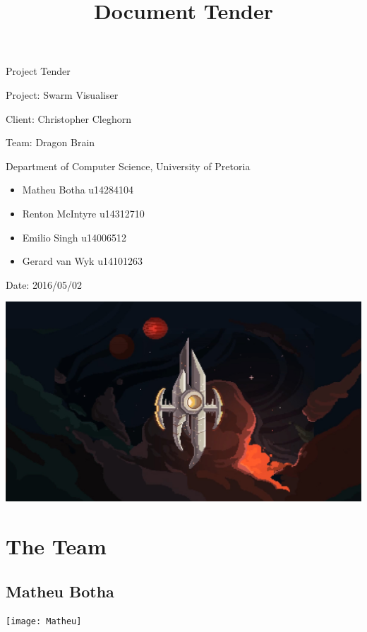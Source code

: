 \documentclass[12pt]{article}
\begin{document}
\title{Document Tender}

\begin{titlepage}
\begin{huge}
\begin{center}
Project Tender

Project: Swarm Visualiser
\\
\begin{LARGE}
Client: Christopher Cleghorn
\end{LARGE}

Team: Dragon Brain
\\
\begin{small}
Department of Computer Science, University of Pretoria
\\
\begin{itemize}
\item Matheu Botha u14284104
\item Renton McIntyre u14312710
\item Emilio Singh u14006512
\item Gerard van Wyk u14101263
\end{itemize}


Date: 2016/05/02

\end{small}

\includegraphics[scale=0.2]{test}
\end{center}

\end{huge}


\end{titlepage}

\pagebreak

\section{The Team}
\subsection{Matheu Botha}
\texttt{[image: Matheu]}
\end{document}
